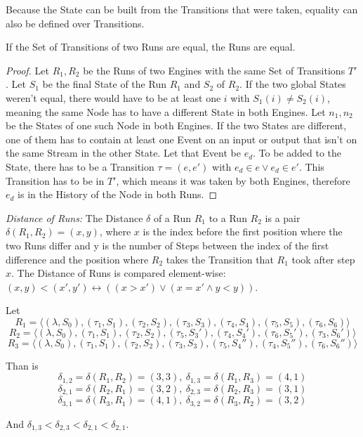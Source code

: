 Because the State can be built from the Transitions that were taken, equality can also be defined over Transitions.

\begin{lemma}
If the Set of Transitions of two Runs are equal, the Runs are equal.
\label{lemma:equal_runs_with_transitions}
\end{lemma}

\begin{proof}
  Let \(R_1, R_2\) be the Runs of two Engines with the same Set of Transitions \(T'\).
  Let \(S_1\) be the final State of the Run \(R_1\) and \(S_2\) of \(R_2\).
  If the two global States weren't equal, there would have to be at least one \(i\) with \(S_1(i) \neq S_2(i)\), meaning the same Node has to have a different State in both Engines.
  Let \(n_1, n_2\) be the States of one such Node in both Engines.
  If the two States are different, one of them has to contain at least one Event on an input or output that isn't on the same Stream in the other State.
  Let that Event be \(e_d\).
  To be added to the State, there has to be a Transition \(\tau = (e, e')\) with \(e_d \in e \lor e_d \in e'\).
  This Transition has to be in \(T'\), which means it was taken by both Engines, therefore \(e_d\) is in the History of the Node in both Runs.
\end{proof}

\begin{definition}
  \emph{Distance of Runs:} The Distance \(\delta\) of a Run \(R_1\) to a Run \(R_2\) is a pair \(\delta(R_1,R_2) = (x,y)\), where \(x\) is the index before the first position where the two Runs differ and y is the number of Steps between the index of the first difference and the position where \(R_2\) takes the Transition that \(R_1\) took after step \(x\).
  The Distance of Runs is compared element-wise: \((x,y) < (x',y') \leftrightarrow ((x > x') \lor (x = x' \land y < y))\).
\label{def:runs_distance}
\end{definition}

\begin{exmp}
  Let
  \[R_1 = \langle (\lambda, S_0), (\tau_1,S_1), (\tau_2,S_2), (\tau_3,S_3), (\tau_4,S_4), (\tau_5,S_5), (\tau_6,S_6) \rangle\]
  \[R_2 = \langle (\lambda, S_0), (\tau_1,S_1), (\tau_2,S_2), (\tau_5,S_3'), (\tau_4,S_4'), (\tau_6,S_5'), (\tau_3,S_6') \rangle\]
  \[R_3 = \langle (\lambda, S_0), (\tau_1,S_1), (\tau_2,S_2), (\tau_3,S_3), (\tau_5,S_4''), (\tau_4,S_5''), (\tau_6,S_6'') \rangle\]

  Than is
  \[\delta_{1,2} = \delta(R_1,R_2) = (3,3),\ \delta_{1,3} = \delta(R_1,R_3) = (4,1)\]
  \[\delta_{2,1} = \delta(R_2,R_1) = (3,2),\ \delta_{2,3} = \delta(R_2,R_3) = (3,1)\]
  \[\delta_{3,1} = \delta(R_3,R_1) = (4,1),\ \delta_{3,2} = \delta(R_3,R_2) = (3,2)\]

  And \(\delta_{1,3} < \delta_{2,3} < \delta_{2,1} < \delta_{2,1}\).


\end{exmp}

